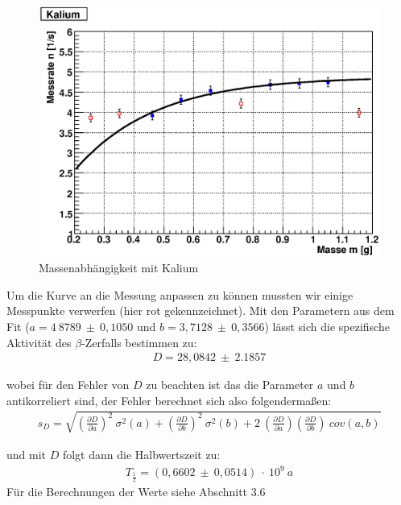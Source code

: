 \documentclass[12pt]{article}
\begin{document}
\begin{figure}[H]  
\centering
\includegraphics[width=0.9\linewidth]{pictures/kalium.eps}
\caption{Massenabhängigkeit mit Kalium}
\end{figure}

Um die Kurve an die Messung anpassen zu können mussten wir einige Messpunkte verwerfen (hier rot gekennzeichnet).
Mit den Parametern aus dem Fit ($a = 4~8789~\pm~0,1050$ und $b = 3,7128~\pm~0,3566$) lässt sich die spezifische Aktivität des $\beta$-Zerfalls bestimmen zu:
\begin{align*}
 D = 28,0842~\pm~2.1857
\end{align*}

wobei für den Fehler von $D$ zu beachten ist das die Parameter $a$ und $b$ antikorreliert sind, der Fehler berechnet sich also folgendermaßen:
\begin{align}
 s_D = \sqrt{\left(\frac{\partial D}{\partial a}\right)^2~\sigma^2(a) + \left(\frac{\partial D}{\partial b}\right)^2~\sigma^2(b) + 
 2~\left(\frac{\partial D}{\partial a}\right)\left(\frac{\partial D}{\partial b}\right)~cov(a,b)}
\end{align}

und mit $D$ folgt dann die Halbwertszeit zu:
\begin{align*}
T_{\frac{1}{2}} = (0,6602~\pm~0,0514)~\cdot~10^9~a
\end{align*}
Für die Berechnungen der Werte siehe Abschnitt 3.6
\newpage
\end{document}
